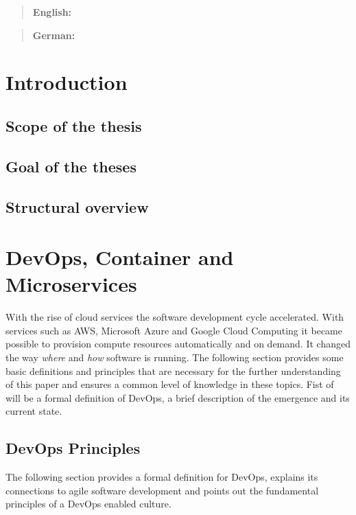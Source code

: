 \documentclass[12pt, a4paper]{article}
\begin{document}


\tableofcontents
{}
\setcounter{lastroman}{\value{page}}

\maketitle
\begin{abstract}
    \textbf{English:} \lipsum[20]
\end{abstract}
\begin{abstract}
    \textbf{German:} \lipsum[20]
\end{abstract}
\newpage
\section{ Introduction}
    \subsection{Scope of the thesis}
    \subsection{Goal of the theses}
    \subsection{Structural overview}
    \newpage
\section{DevOps, Container and Microservices}
With the rise of cloud services the software development cycle accelerated. With services such as \ac{AWS}, Microsoft Azure and Google Cloud Computing it became possible to provision compute resources automatically and on demand. It changed the way \textit{where} and \textit{how} software is running.\newline
The following section provides some basic definitions and principles that are necessary for the further understanding of this paper and ensures a common level of knowledge in these topics.\newline
Fist of will be a formal definition of DevOps, a brief description of the emergence and its current state.
    \subsection{DevOps Principles}
    The following section provides a formal definition for DevOps, explains its connections to agile software development and points out the fundamental principles of a DevOps enabled culture.
\end{document}
